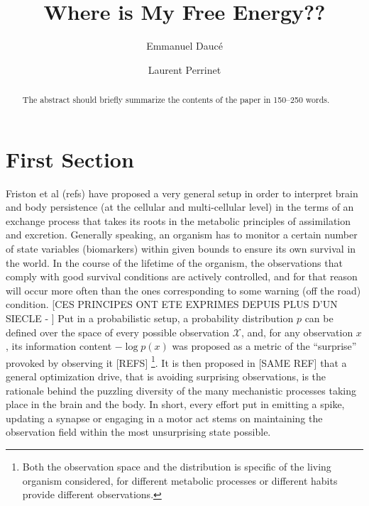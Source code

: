 \documentclass[runningheads]{llncs}
\begin{document}
%
\title{Where is My Free Energy??}
%
%
\author{Emmanuel Daucé \and
Laurent Perrinet}
%
%
%
\maketitle              %
%
\begin{abstract}
The abstract should briefly summarize the contents of the paper in
150--250 words.

\end{abstract}
%
%
%
\section{First Section}

Friston et al (refs) have proposed a very general setup in order to interpret brain and body persistence (at the cellular and multi-cellular level) in the terms of an exchange process that takes its roots in the metabolic principles of assimilation and excretion. Generally speaking, an organism has to monitor a certain number of state variables (biomarkers) within given bounds to ensure its own survival in the world. In the course of the lifetime of the organism, the observations that comply with good survival conditions are actively controlled, and for that reason will occur more often than the ones corresponding to some warning (off the road) condition. 
[CES PRINCIPES ONT ETE EXPRIMES DEPUIS PLUS D'UN SIECLE - ]
Put in a probabilistic setup, a probability distribution $p$ can be defined over the space of every possible observation $\mathcal{X}$, and, for any observation $x$, its information content $-\log p(x)$ was proposed as a metric of the ``surprise'' provoked by observing it [REFS] \footnote{Both the observation space and the distribution is specific of the living organism considered, for different metabolic processes or different habits provide different observations.}. It is then proposed in [SAME REF] that a general optimization drive, that is avoiding surprising observations, is the rationale behind the puzzling diversity of the many mechanistic processes taking place in the brain and the body. In short, every effort put in emitting a spike, updating a synapse or engaging in a motor act stems on maintaining the observation field within the most unsurprising state possible.
\end{document}
